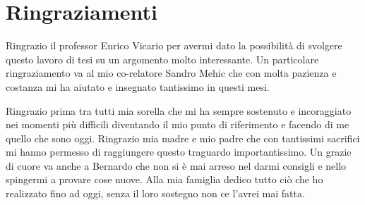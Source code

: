 \chapter{Ringraziamenti}

Ringrazio il professor Enrico Vicario per avermi dato la possibilità di svolgere questo lavoro di tesi su un argomento molto interessante. Un particolare ringraziamento va al mio co-relatore Sandro Mehic che con molta pazienza e costanza mi ha aiutato e insegnato tantissimo in questi mesi.

Ringrazio prima tra tutti mia sorella che mi ha sempre sostenuto e incoraggiato nei momenti più difficili diventando il mio punto di riferimento e facendo di me quello che sono oggi. Ringrazio mia madre e mio padre che con tantissimi sacrifici mi hanno permesso di raggiungere questo traguardo importantissimo. Un grazie di cuore va anche a Bernardo che non si è mai arreso nel darmi consigli e nello spingermi a provare cose nuove. Alla mia famiglia dedico tutto ciò che ho realizzato fino ad oggi, senza il loro sostegno non ce l'avrei mai fatta.